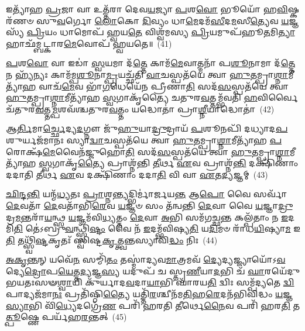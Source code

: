 𑌇𑌤𑍍𑌯𑌾᳴𑌹 \ul{𑌪𑍍𑌰}\-𑌜𑌾 𑌵𑌾 𑌉𑌤𑍍𑌤᳴𑌰𑌾 𑌦𑍇𑌵\-\ul{𑌯}\-𑌜𑍍𑌯𑌾 \ul{𑌪}\-𑌶\-\ul{𑌵𑍋} 𑌭𑍂𑌯𑍋᳴ 𑌹\-\ul{𑌵𑌿}\-𑌷𑍍𑌕𑌰᳴𑌣𑍞 𑌸𑍁\-\ul{𑌵}\-𑌰𑍍𑌗𑍋 \ul{𑌲𑍋}\-𑌕𑍋 \ul{𑌦𑌿}\-𑌵𑍍𑌯𑌂 𑌧𑌾\-\ul{𑌮𑍇}\-𑌦𑌮᳴\-\ul{𑌸𑍀}\-𑌦\-\ul{𑌮}\-𑌸𑍀\-\ul{𑌤𑍍𑌯𑍇}\-𑌵 \ul{𑌯}\-𑌜𑍍𑌞𑌸𑍍𑌯᳴ \ul{𑌪𑍍𑌰𑌿}\-𑌯𑌂 𑌧𑌾𑌮𑍋𑌪᳴ 𑌹𑍍𑌵𑌯\-\ul{𑌤𑍇} 𑌵𑌿𑌶𑍍𑌵᳴𑌮𑌸𑍍𑌯 \ul{𑌪𑍍𑌰𑌿}\-𑌯𑌮𑍁𑌪᳴𑌹𑍂\-\ul{𑌤}\-𑌮𑌿\-\ul{𑌤𑍍𑌯𑌾}\-𑌹𑌾𑌛᳴𑌮𑍍𑌬𑌟𑍍𑌕𑌾𑌰\-\ul{𑌮𑍇}\-𑌵𑍋𑌪᳴ 𑌹𑍍𑌵𑌯𑌤𑍇॥~(41)

{\anuvakamend[{\-\ul{𑌆}\-\-\ul{𑌹} \ul{𑌧𑍇}\-𑌨𑍁\-\ul{𑌰𑍇}\-𑌤𑌾𑌂 𑌵\-\ul{𑌰𑍍𑌧𑌾}\-𑌨𑌿𑌤𑍍𑌯𑌾᳴\-\ul{𑌹} 𑌧𑌾\-\ul{𑌮}\-𑌨𑍍𑌨𑍁𑌪᳴𑌹𑍂\-\ul{𑌤}\-𑌶𑍍𑌚𑌤𑍁᳴𑌸𑍍𑌤𑍍𑌰𑌿𑍞𑌶𑌚𑍍𑌚}]}%

\-\ul{𑌪}\-𑌶\-\ul{𑌵𑍋} 𑌵𑌾 𑌇𑌡𑌾॑ \ul{𑌸𑍍𑌵}\-𑌯𑌮𑌾 𑌦᳴\-\ul{𑌤𑍍𑌤𑍇} 𑌕𑌾𑌮᳴\-\ul{𑌮𑍇}\-𑌵𑌾𑌤𑍍𑌮𑌨𑌾᳴ 𑌪\-\ul{𑌶𑍂}\-𑌨𑌾𑌮𑌾 𑌦᳴\-\ul{𑌤𑍍𑌤𑍇} 𑌨 𑌹𑍍𑌯᳴𑌨𑍍𑌯𑌃 𑌕𑌾𑌮᳴𑌮𑍍𑌪\-\ul{𑌶𑍂}\-𑌨𑌾\-\ul{𑌮𑍍𑌪𑍍𑌰}\-𑌯𑌚𑍍𑌛᳴𑌤𑌿 \ul{𑌵𑌾}\-𑌚𑌸𑍍𑌪𑌤᳴𑌯𑍇 𑌤𑍍𑌵𑌾 \ul{𑌹𑍁}\-𑌤𑌮𑍍𑌪𑍍𑌰𑌾\-\ul{𑌶𑍍𑌨𑌾}\-𑌮𑍀𑌤𑍍𑌯𑌾᳴\-\ul{𑌹} 𑌵𑌾𑌚᳴\-\ul{𑌮𑍇}\-𑌵 𑌭𑌾᳴\-\ul{𑌗}\-𑌧𑍇𑌯𑍇᳴𑌨 𑌪𑍍𑌰𑍀𑌣𑌾\-\ul{𑌤𑌿} 𑌸𑌦᳴\-\ul{𑌸}\-𑌸𑍍𑌪𑌤᳴𑌯𑍇 𑌤𑍍𑌵𑌾 \ul{𑌹𑍁}\-𑌤𑌮𑍍𑌪𑍍𑌰𑌾\-\ul{𑌶𑍍𑌨𑌾}\-𑌮𑍀𑌤𑍍𑌯𑌾᳴𑌹 \ul{𑌸𑍍𑌵}\-𑌗𑌾𑌕𑍃᳴𑌤𑍍𑌯𑍈 𑌚𑌤𑍁𑌰\-\ul{𑌵}\-𑌤𑍍𑌤𑌮𑍍𑌭᳴𑌵𑌤𑌿 \ul{𑌹}\-𑌵𑌿𑌰𑍍𑌵𑍈 𑌚᳴𑌤𑍁𑌰\-\ul{𑌵}\-𑌤𑍍𑌤\-\ul{𑌮𑍍𑌪}\-𑌶𑌵᳴𑌶𑍍𑌚𑌤𑍁𑌰\-\ul{𑌵}\-𑌤𑍍𑌤𑌂 𑌯𑌦𑍍𑌧𑍋𑌤𑌾॑ 𑌪𑍍𑌰𑌾\-\ul{𑌶𑍍𑌨𑍀}\-𑌯𑌾𑌦𑍍𑌧𑍋𑌤𑌾॑~(42)

𑌆\-\ul{𑌰𑍍𑌤𑌿}\-𑌮𑌾\-\ul{𑌰𑍍𑌚𑍍𑌛𑍇}\-𑌦𑍍𑌯\-\ul{𑌦}\-𑌗𑍍𑌨𑍗 𑌜𑍁᳴\-\ul{𑌹𑍁}\-𑌯𑌾\-\ul{𑌦𑍍𑌰𑍁}\-𑌦𑍍𑌰𑌾𑌯᳴ \ul{𑌪}\-𑌶𑍂𑌨𑌪𑌿᳴ 𑌦𑌧𑍍𑌯𑌾𑌦\-\ul{𑌪}\-𑌶𑍁𑌰𑍍𑌯𑌜᳴𑌮𑌾𑌨𑌃 𑌸𑍍𑌯𑌾\-\ul{𑌦𑍍𑌵𑌾}\-𑌚𑌸𑍍𑌪𑌤᳴𑌯𑍇 𑌤𑍍𑌵𑌾 \ul{𑌹𑍁}\-𑌤𑌮𑍍𑌪𑍍𑌰𑌾\-\ul{𑌶𑍍𑌨𑌾}\-𑌮𑍀𑌤𑍍𑌯𑌾᳴𑌹 \ul{𑌪}\-𑌰𑍋𑌕𑍍𑌷᳴\-\ul{𑌮𑍇}\-𑌵𑍈𑌨᳴𑌜𑍍𑌜𑍁𑌹𑍋\-\ul{𑌤𑌿} 𑌸𑌦᳴\-\ul{𑌸}\-𑌸𑍍𑌪𑌤᳴𑌯𑍇 𑌤𑍍𑌵𑌾 \ul{𑌹𑍁}\-𑌤𑌮𑍍𑌪𑍍𑌰𑌾\-\ul{𑌶𑍍𑌨𑌾}\-𑌮𑍀𑌤𑍍𑌯𑌾᳴𑌹 \ul{𑌸𑍍𑌵}\-𑌗𑌾𑌕𑍃᳴\-\ul{𑌤𑍍𑌯𑍈} 𑌪𑍍𑌰𑌾𑌶𑍍𑌨᳴𑌨𑍍𑌤𑌿 \ul{𑌤𑍀}\-𑌰𑍍𑌥 \ul{𑌏}\-𑌵 𑌪𑍍𑌰𑌾𑌶𑍍𑌨᳴\-\ul{𑌨𑍍𑌤𑌿} 𑌦𑌕𑍍𑌷𑌿᳴𑌣𑌾𑌂 𑌦𑌦𑌾𑌤𑌿 \ul{𑌤𑍀}\-𑌰𑍍𑌥 \ul{𑌏}\-𑌵 𑌦𑌕𑍍𑌷𑌿᳴𑌣𑌾𑌂 𑌦𑌦𑌾\-\ul{𑌤𑌿} 𑌵𑌿 𑌵𑌾 \ul{𑌏}\-𑌤\-\ul{𑌦𑍍𑌯}\-𑌜𑍍𑌞𑌮𑍍~(43)

\-\ul{𑌛𑌿}\-\-\ul{𑌨𑍍𑌦}\-\-\ul{𑌨𑍍𑌤𑌿} 𑌯𑌨𑍍𑌮᳴\-\ul{𑌧𑍍𑌯}\-𑌤𑌃 \ul{𑌪𑍍𑌰𑌾}\-𑌶𑍍𑌨\-\ul{𑌨𑍍𑌤𑍍𑌯}\-𑌦𑍍𑌭𑌿𑌰𑍍𑌮𑌾॑𑌰𑍍𑌜𑌯\-\ul{𑌨𑍍𑌤} 𑌆\-\ul{𑌪𑍋} 𑌵𑍈 𑌸𑌰𑍍𑌵𑌾᳴ \ul{𑌦𑍇}\-𑌵𑌤𑌾᳴ \ul{𑌦𑍇}\-𑌵𑌤𑌾᳴𑌭𑌿\-\ul{𑌰𑍇}\-𑌵 \ul{𑌯}\-𑌜𑍍𑌞𑍞 𑌸𑌂 𑌤᳴𑌨𑍍𑌵𑌨𑍍𑌤𑌿 \ul{𑌦𑍇}\-𑌵𑌾 𑌵𑍈 \ul{𑌯}\-𑌜𑍍𑌞𑌾\-\ul{𑌦𑍍𑌰𑍁}\-𑌦𑍍𑌰\-\ul{𑌮}\-𑌨𑍍𑌤𑌰𑌾᳴\-\ul{𑌯}\-𑌨𑍍𑌥𑍍𑌸 \ul{𑌯}\-𑌜𑍍𑌞𑌮᳴𑌵𑌿\-\ul{𑌧𑍍𑌯}\-𑌤𑍍𑌤𑌂 \ul{𑌦𑍇}\-𑌵𑌾 \ul{𑌅}\-𑌭𑌿 𑌸𑌮᳴𑌗𑌚𑍍𑌛\-\ul{𑌨𑍍𑌤} 𑌕𑌲𑍍𑌪᳴𑌤𑌾𑌂 𑌨 \ul{𑌇}\-𑌦𑌮𑌿\-\ul{𑌤𑌿} 𑌤𑍇॑\-𑌽𑌬𑍍𑌰𑍁\-\ul{𑌵}\-𑌨𑍍𑌥𑍍𑌸𑍍𑌵𑌿᳴\-\ul{𑌷𑍍𑌟𑌂} 𑌵𑍈 𑌨᳴ \ul{𑌇}\-𑌦𑌮𑍍𑌭᳴𑌵𑌿𑌷𑍍𑌯\-\ul{𑌤𑌿} 𑌯\-\ul{𑌦𑌿}\-𑌮𑍞 𑌰𑌾᳴𑌧\-\ul{𑌯𑌿}\-𑌷𑍍𑌯𑌾\-\ul{𑌮} 𑌇\-\ul{𑌤𑌿} 𑌤𑌥𑍍𑌸𑍍𑌵𑌿᳴\-\ul{𑌷𑍍𑌟}\-𑌕𑍃𑌤𑌃᳴ 𑌸𑍍𑌵𑌿𑌷𑍍𑌟\-\ul{𑌕𑍃}\-𑌤𑍍𑌤𑍍𑌵𑌨𑍍𑌤𑌸𑍍𑌯𑌾𑌵𑌿᳴\-\ul{𑌦𑍍𑌧𑌂} 𑌨𑌿𑌃~(44)

\-\ul{𑌅}\-\-\ul{𑌕𑍃}\-\-\ul{𑌨𑍍𑌤}\-𑌨𑍍 𑌯𑌵𑍇᳴\-\ul{𑌨} 𑌸𑌮𑍍𑌮𑌿᳴\-\ul{𑌤𑌂} 𑌤𑌸𑍍𑌮𑌾॑𑌦𑍍𑌯𑌵\-\ul{𑌮𑌾}\-𑌤𑍍𑌰𑌮𑌵᳴ \ul{𑌦𑍍𑌯𑍇}\-𑌦𑍍𑌯𑌜𑍍𑌜𑍍𑌯𑌾𑌯𑍋᳴\-𑌽\-\ul{𑌵}\-𑌦𑍍𑌯𑍇\-\ul{𑌦𑍍𑌰𑍋}\-𑌪\-\ul{𑌯𑍇}\-𑌤𑍍𑌤\-\ul{𑌦𑍍𑌯}\-𑌜𑍍𑌞\-\ul{𑌸𑍍𑌯} 𑌯𑌦𑍁𑌪᳴ 𑌚 𑌸𑍍𑌤𑍃\-\ul{𑌣𑍀}\-𑌯𑌾\-\ul{𑌦}\-𑌭𑌿 𑌚᳴ \ul{𑌘𑌾}\-𑌰𑌯𑍇᳴𑌦𑍁𑌭𑌯𑌤𑌃𑌸𑍟\-\ul{𑌶𑍍𑌵𑌾}\-𑌯𑌿 𑌕𑍁᳴𑌰𑍍𑌯𑌾𑌦\-\ul{𑌵}\-𑌦𑌾\-\ul{𑌯𑌾}\-𑌭𑌿 𑌘𑌾᳴𑌰𑌯\-\ul{𑌤𑌿} 𑌦𑍍𑌵𑌿𑌃 𑌸𑌮𑍍𑌪᳴𑌦𑍍𑌯𑌤𑍇 \ul{𑌦𑍍𑌵𑌿}\-𑌪𑌾𑌦𑍍𑌯𑌜᳴𑌮𑌾\-\ul{𑌨𑌃} 𑌪𑍍𑌰𑌤𑌿᳴𑌷𑍍𑌠𑌿\-\ul{𑌤𑍍𑌯𑍈} 𑌯𑌤𑍍𑌤𑌿᳴\-\ul{𑌰}\-𑌶𑍍𑌚𑍀𑌨᳴𑌮\-\ul{𑌤𑌿}\-𑌹\-\ul{𑌰𑍇}\-𑌦𑌨᳴𑌭𑌿𑌵𑌿𑌦𑍍𑌧𑌂 \ul{𑌯}\-𑌜𑍍𑌞\-\ul{𑌸𑍍𑌯𑌾}\-𑌭𑌿 𑌵𑌿᳴\-\ul{𑌧𑍍𑌯𑍇}\-𑌦𑌗𑍍𑌰𑍇᳴\-\ul{𑌣} 𑌪𑌰𑌿᳴ 𑌹𑌰𑌤𑌿 \ul{𑌤𑍀}\-𑌰𑍍𑌥𑍇\-\ul{𑌨𑍈}\-𑌵 𑌪𑌰𑌿᳴ 𑌹𑌰\-\ul{𑌤𑌿} 𑌤\-\ul{𑌤𑍍𑌪𑍂}\-𑌷𑍍𑌣𑍇 𑌪𑌰𑍍𑌯᳴𑌹\-\ul{𑌰}\-𑌨𑍍𑌤𑌤𑍍~(45)

